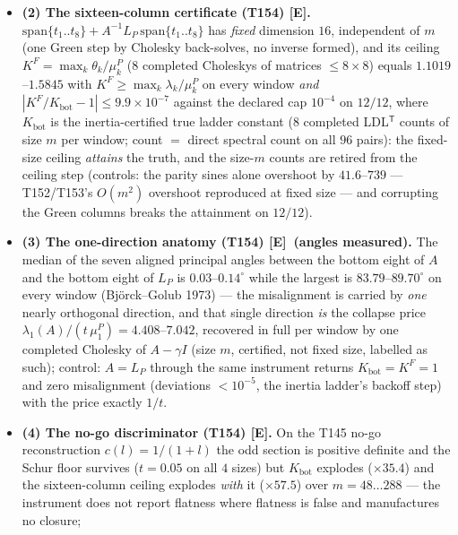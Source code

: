 \documentclass[11pt]{article}
\providecommand{\mE}{\textbf{[E]}}\providecommand{\mC}{\textbf{[C]}}
\begin{document}
\begin{itemize}[leftmargin=1.5em]
\emph{no} residual argument at all; Temple 1928 / Kato 1949 is a floor device and is used
nowhere in the module. Negative control: the \emph{reversed} reading (Ritz values as lower
bounds) is recognised as false on $12/12$ windows, $\theta_k$ overshooting $\lambda_k$ by a
factor $\ge18.6$ somewhere on every window.
\item \textbf{(2) The sixteen-column certificate (T154) \mE.}
$\mathrm{span}\{t_1..t_8\}+A^{-1}L_P\,\mathrm{span}\{t_1..t_8\}$ has \emph{fixed} dimension
$16$, independent of $m$ (one Green step by Cholesky back-solves, no inverse formed), and its
ceiling $K^F=\max_k\theta_k/\mu^P_k$ ($8$ completed Choleskys of matrices $\le8\times8$)
equals $1.1019$--$1.5845$ with $K^F\ge\max_k\lambda_k/\mu^P_k$ on every window \emph{and}
$|K^F/K_{\mathrm{bot}}-1|\le9.9\times10^{-7}$ against the declared cap $10^{-4}$ on $12/12$,
where $K_{\mathrm{bot}}$ is the inertia-certified true ladder constant ($8$ completed
LDL$^{\mathsf T}$ counts of size $m$ per window; count $=$ direct spectral count on all $96$
pairs): the fixed-size ceiling \emph{attains} the truth, and the size-$m$ counts are retired
from the ceiling step (controls: the parity sines alone overshoot by $41.6$--$739$ ---
T152/T153's $O(m^2)$ overshoot reproduced at fixed size --- and corrupting the Green columns
breaks the attainment on $12/12$).
\item \textbf{(3) The one-direction anatomy (T154) \mE\ (angles measured).} The median of the
seven aligned principal angles between the bottom eight of $A$ and the bottom eight of $L_P$
is $0.03$--$0.14^\circ$ while the largest is $83.79$--$89.70^\circ$ on every window
(Bj\"orck--Golub 1973) --- the misalignment is carried by \emph{one} nearly orthogonal
direction, and that single direction \emph{is} the collapse price
$\lambda_1(A)/(t\,\mu^P_1)=4.408$--$7.042$, recovered in full per window by one completed
Cholesky of $A-\gamma I$ (size $m$, certified, not fixed size, labelled as such); control:
$A=L_P$ through the same instrument returns $K_{\mathrm{bot}}=K^F=1$ and zero misalignment
(deviations $<10^{-5}$, the inertia ladder's backoff step) with the price exactly $1/t$.
\item \textbf{(4) The no-go discriminator (T154) \mE.} On the T145 no-go reconstruction
$c(l)=1/(1+l)$ the odd section is positive definite and the Schur floor survives ($t=0.05$ on
all $4$ sizes) but $K_{\mathrm{bot}}$ explodes ($\times35.4$) and the sixteen-column ceiling
explodes \emph{with} it ($\times57.5$) over $m=48\ldots288$ ---
the instrument does not report flatness where flatness is false and manufactures no closure;

\end{itemize}
\end{document}
